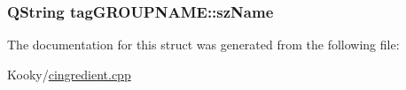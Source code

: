 \subsubsection[{\texorpdfstring{sz\+Name}{szName}}]{\setlength{\rightskip}{0pt plus 5cm}Q\+String tag\+G\+R\+O\+U\+P\+N\+A\+M\+E\+::sz\+Name}\hypertarget{structtag_g_r_o_u_p_n_a_m_e_a9edbd20fb9240c9cfb7692434113b1ce}{}\label{structtag_g_r_o_u_p_n_a_m_e_a9edbd20fb9240c9cfb7692434113b1ce}


The documentation for this struct was generated from the following file\+:\begin{DoxyCompactItemize}
\item 
Kooky/\hyperlink{cingredient_8cpp}{cingredient.\+cpp}\end{DoxyCompactItemize}
